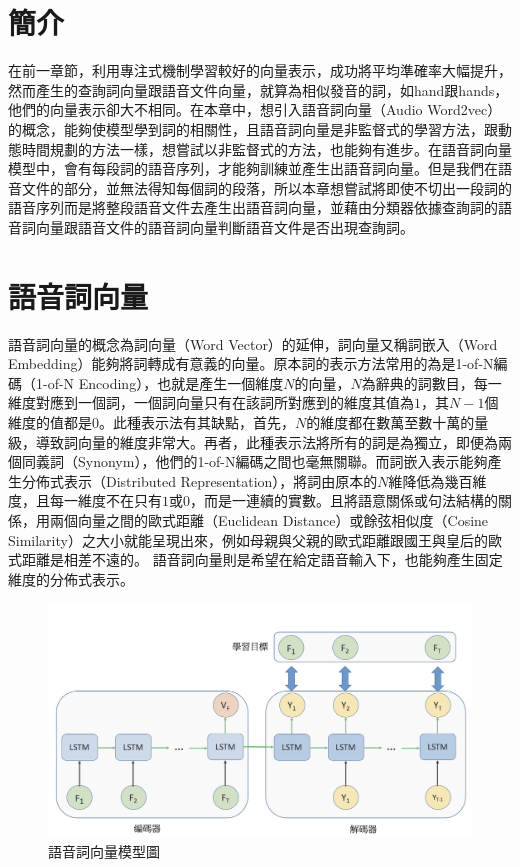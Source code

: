 \label{ch5}
\section{簡介}
在前一章節，利用專注式機制學習較好的向量表示，成功將平均準確率大幅提升，然而產生的查詢詞向量跟語音文件向量，就算為相似發音的詞，如hand跟hands，他們的向量表示卻大不相同。在本章中，想引入語音詞向量（Audio
Word2vec）的概念，能夠使模型學到詞的相關性，且語音詞向量是非監督式的學習方法，跟動態時間規劃的方法一樣，想嘗試以非監督式的方法，也能夠有進步。在語音詞向量模型中，會有每段詞的語音序列，才能夠訓練並產生出語音詞向量。但是我們在語音文件的部分，並無法得知每個詞的段落，所以本章想嘗試將即使不切出一段詞的語音序列而是將整段語音文件去產生出語音詞向量，並藉由分類器依據查詢詞的語音詞向量跟語音文件的語音詞向量判斷語音文件是否出現查詢詞。

\section{語音詞向量}
語音詞向量的概念為詞向量（Word Vector）的延伸，詞向量又稱詞嵌入（Word
Embedding）能夠將詞轉成有意義的向量。原本詞的表示方法常用的為是1-of-N編
碼（1-of-N
Encoding），也就是產生一個維度$N$的向量，$N$為辭典的詞數目，每一維度對應到一個詞，一個詞向量只有在該詞所對應到的維度其值為$1$，其$N-1$個維度的值都是$0$。此種表示法有其缺點，首先，$N$的維度都在數萬至數十萬的量級，導致詞向量的維度非常大。再者，此種表示法將所有的詞是為獨立，即便為兩個同義詞（Synonym），他們的1-of-N編碼之間也毫無關聯。而詞嵌入表示能夠產生分佈式表示（Distributed
Representation），將詞由原本的$N$維降低為幾百維度，且每一維度不在只有$1$或$0$，而是一連續的實數。且將語意關係或句法結構的關係，用兩個向量之間的歐式距離（Euclidean
Distance）或餘弦相似度（Cosine
Similarity）之大小就能呈現出來，例如母親與父親的歐式距離跟國王與皇后的歐式距離是相差不遠的。
語音詞向量則是希望在給定語音輸入下，也能夠產生固定維度的分佈式表示。
\begin{figure}[h]
\centering
\includegraphics[scale=0.5]{images/ch5_seq2seq.png} 
\caption{語音詞向量模型圖}
\label{ch5_seq2seq}
\end{figure}
\label{ch5_seq2seq}

